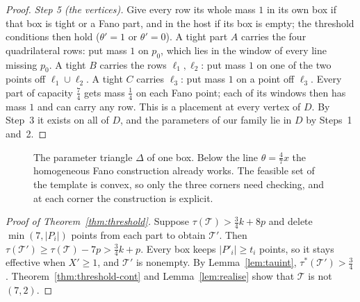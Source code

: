 \documentclass[11pt]{amsart}
\theoremstyle{definition}
\theoremstyle{remark}
\begin{document}
\begin{proof}
\emph{Step 5 (the vertices).} Give every row its whole mass $1$ in its own box if that box is tight or a Fano part, and in the host if its box is empty; the threshold conditions then hold ($\theta'=1$ or $\theta'=0$). A tight part $A$ carries the four quadrilateral rows: put mass $1$ on $p_0$, which lies in the window of every line missing $p_0$. A tight $B$ carries the rows $\ell_1,\ell_2$: put mass $1$ on one of the two points off $\ell_1\cup\ell_2$. A tight $C$ carries $\ell_3$: put mass $1$ on a point off $\ell_3$. Every part of capacity $\frac74$ gets mass $\frac14$ on each Fano point; each of its windows then has mass $1$ and can carry any row. This is a placement at every vertex of $D$. By Step~3 it exists on all of $D$, and the parameters of our family lie in $D$ by Steps~1 and~2.
\end{proof}


\begin{figure}[t]
\centering
{}
\caption{The parameter triangle $\Delta$ of one box. Below the line $\theta=\frac47x$ the homogeneous Fano construction already works. The feasible set of the template is convex, so only the three corners need checking, and at each corner the construction is explicit.}\label{fig:triangle}
\end{figure}

\begin{proof}[Proof of Theorem~\ref{thm:threshold}]
Suppose $\tau(\mathcal T)>\frac34k+8p$ and delete $\min(7,|P_i|)$ points from each part to obtain $\mathcal T'$. Then $\tau(\mathcal T')\ge\tau(\mathcal T)-7p>\frac34k+p$. Every box keeps $|P'_i|\ge t_i$ points, so it stays effective when $X'\ge1$, and $\mathcal T'$ is nonempty. By Lemma~\ref{lem:tauint}, $\tau^*(\mathcal T')>\frac34$. Theorem~\ref{thm:threshold-cont} and Lemma~\ref{lem:realise} show that $\mathcal T$ is not $(7,2)$.
\end{proof}
\end{document}
